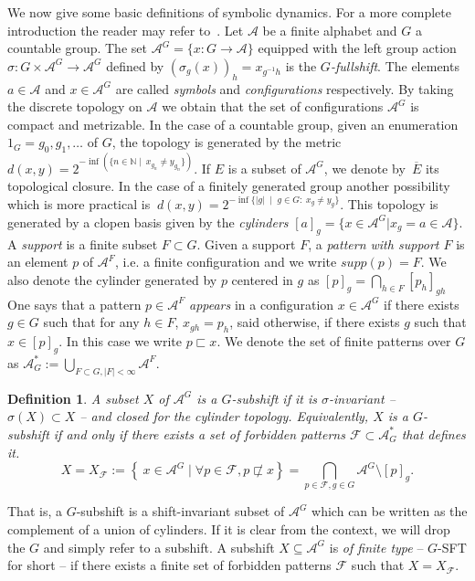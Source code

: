 \documentclass[letterpaper]{amsart}
\theoremstyle{plain}
\newtheorem{definition}{Definition}[section]
\def\NN{\mathbb{N}}
\def\ag{\mathcal{A}}
\def\FF{\mathcal{F}}
\newcommand{\define}[1]{\emph{#1}}
\newcommand{\cor}[2][]{#2}
\begin{document}
	
	We now give some basic definitions of symbolic dynamics. For a more complete introduction the reader may refer to~\cite{lind1995introduction,ceccherini-SilbersteinC09}. Let $\ag$ be a finite alphabet and $G$ a countable group. The set $\ag^G = \{ x: G \to \ag\}$ equipped with the left group action $\sigma: G \times \ag^G \to \ag^G$ defined by $(\sigma_g(x))_h = x_{g^{-1}h}$ is the \textit{$G$-fullshift}. The elements $a \in \ag$ and $x \in \ag^G$ are called \define{symbols} and \define{configurations} respectively. By taking the discrete topology on $\ag$ we obtain that the set of configurations $\ag^G$ is compact and metrizable. In the case of a countable group, given an enumeration $1_G = g_0,g_1,\dots$ of $G$, the topology is generated by the metric $d(x,y) = 2^{-\inf (\{ n \in \NN \mid\ x_{g_n} \neq y_{g_n}  \})}$. If $E$ is a subset of $\ag^G$, we denote by~$\overline{E}$ its topological closure. In the case of a finitely generated group another possibility which is more practical is $\
	\displaystyle{d(x,y) = 2^{-\inf\{|g|\; \mid\; g \in G:\; x_g \neq y_g\}}}$. This topology is generated by a clopen basis given by the \define{cylinders} $[a]_g = \{x \in \ag^G | x_g = a\in \ag\}$. A \emph{support} is a finite subset $F \subset G$. Given a support $F$, a \emph{pattern with support $F$} is an element $p$ of $\ag^F$, i.e. a finite configuration and we write $supp(p) = F$. We also denote the cylinder generated by $p$ centered in $g$ as $[p]_g = \bigcap_{h \in F}[p_h]_{gh}$
	One says that a pattern $p\in \ag^{F}$ \emph{appears} in a configuration $x \in \ag^G$ if there exists $g \in G$ such that for any $h \in F$, $x_{gh} = p_h$, said otherwise, if there exists $g$ such that $x \in [p]_g$. In this case we write $p \sqsubset x$. We denote the set of finite patterns over $G$ as $\ag_G^* := \bigcup_{F \subset G, |F| < \infty}{\ag^F}$.
	\begin{definition}
		A subset $X$ of $\ag^G$ is a \define{$G$-subshift} if it is $\sigma$-invariant -- $\sigma(X)\subset X$ -- and closed for the cylinder topology. Equivalently, $X$ is a $G$-subshift if and only if there exists a set of forbidden patterns $\FF \subset \ag_G^*$ that defines it.
		$$X=X_\FF := \left\{\ x\in \ag^G\mid \forall p \in \FF, p \not\sqsubset x \right\} = \bigcap_{p \in \FF, g \in G}{\ag^G \setminus [p]_g}.$$
	\end{definition}
	
	That is, a $G$-subshift is a shift-invariant subset of $\ag^G$ which can be written as the complement of a union of cylinders.
	If \cor[the context is clear enough]{it is clear from the context}, we will drop the $G$ and simply refer to a subshift. A subshift $X\subseteq \ag^G$ is \define{of finite type} -- $G$-SFT for short -- if there exists a finite set of forbidden patterns $\FF$ such that $X=X_\FF$. 
	
\end{document}
